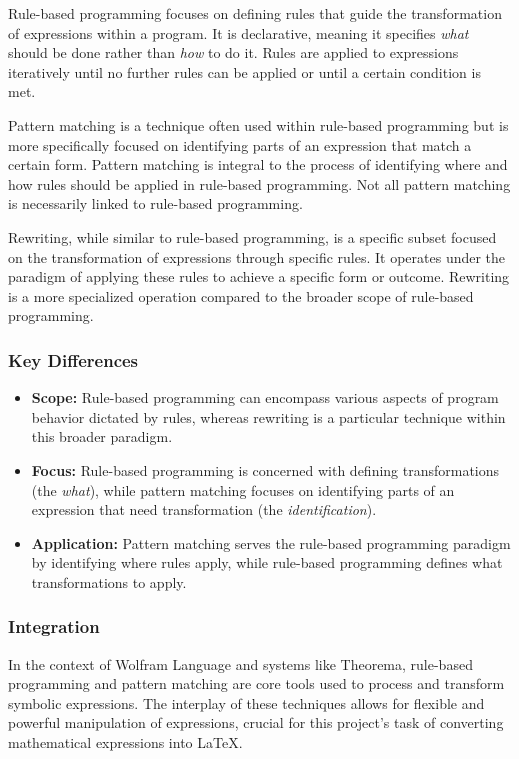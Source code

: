 Rule-based programming focuses on defining rules that guide the transformation of expressions within a program. It is declarative, meaning it specifies \textit{what} should be done rather than \textit{how} to do it. Rules are applied to expressions iteratively until no further rules can be applied or until a certain condition is met.

Pattern matching is a technique often used within rule-based programming but is more specifically focused on identifying parts of an expression that match a certain form. Pattern matching is integral to the process of identifying where and how rules should be applied in rule-based programming. Not all pattern matching is necessarily linked to rule-based programming.

Rewriting, while similar to rule-based programming, is a specific subset focused on the transformation of expressions through specific rules. It operates under the paradigm of applying these rules to achieve a specific form or outcome. Rewriting is a more specialized operation compared to the broader scope of rule-based programming.

\subsubsection*{Key Differences}
\begin{itemize}
    \item \textbf{Scope:} Rule-based programming can encompass various aspects of program behavior dictated by rules, whereas rewriting is a particular technique within this broader paradigm.
    \item \textbf{Focus:} Rule-based programming is concerned with defining transformations (the \textit{what}), while pattern matching focuses on identifying parts of an expression that need transformation (the \textit{identification}).
    \item \textbf{Application:} Pattern matching serves the rule-based programming paradigm by identifying where rules apply, while rule-based programming defines what transformations to apply.
\end{itemize}

\subsubsection*{Integration}
In the context of Wolfram Language and systems like Theorema, rule-based programming and pattern matching are core tools used to process and transform symbolic expressions. The interplay of these techniques allows for flexible and powerful manipulation of expressions, crucial for this project's task of converting mathematical expressions into \LaTeX.
